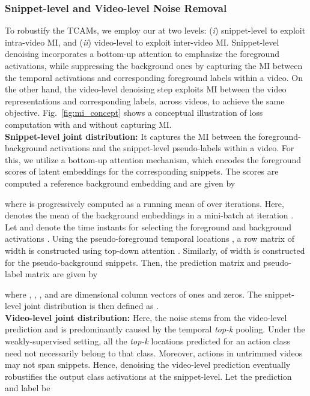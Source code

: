\documentclass[10pt,twocolumn,letterpaper]{article}
\begin{document}
\subsubsection{Snippet-level and Video-level Noise Removal\label{sec:intra_inter_MI}}
To robustify the TCAMs, we employ our  at two levels: (\textit{i}) snippet-level to exploit intra-video MI, and (\textit{ii}) video-level to exploit inter-video MI. 
Snippet-level denoising incorporates a bottom-up attention to emphasize the foreground activations, while suppressing the background ones by capturing the MI between the temporal activations and corresponding foreground labels within a video. 
On the other hand, the video-level denoising step exploits MI between the video representations and corresponding labels, across videos, to achieve the same objective. 
Fig.~\ref{fig:mi_concept} shows a conceptual illustration of loss computation with and without capturing MI. \\
\noindent\textbf{Snippet-level joint distribution:}
It captures the MI between the foreground-background activations and the snippet-level pseudo-labels within a video. For this, we utilize a bottom-up attention mechanism, which encodes the foreground scores  of latent embeddings  for the corresponding snippets. The scores  are computed \wrt a reference background embedding  and are given by

where  is progressively computed as a running mean of  over  iterations. Here,  denotes the mean of the background embeddings in a mini-batch at iteration . 
Let  and  denote the time instants for selecting the foreground and background activations \wrt . Using the pseudo-foreground temporal locations , a row matrix
 of width  is constructed using top-down attention  . Similarly,  of width  is constructed for the pseudo-background snippets. 
Then, the prediction matrix  and pseudo-label matrix  are given by

where , , ,  and  are  dimensional column vectors of ones and zeros.
The snippet-level joint distribution is then defined as . \\
\textbf{Video-level joint distribution:}
Here, the noise stems from the video-level prediction  and is predominantly caused by the temporal \textit{top-k} pooling. Under the weakly-supervised setting, all the \textit{top-k} locations predicted for an action class need not necessarily belong to that class. Moreover, actions in untrimmed videos may not span  snippets.
Hence, denoising the video-level prediction  eventually robustifies the output class activations at the snippet-level. 
Let the prediction  and label  be 
\end{document}
